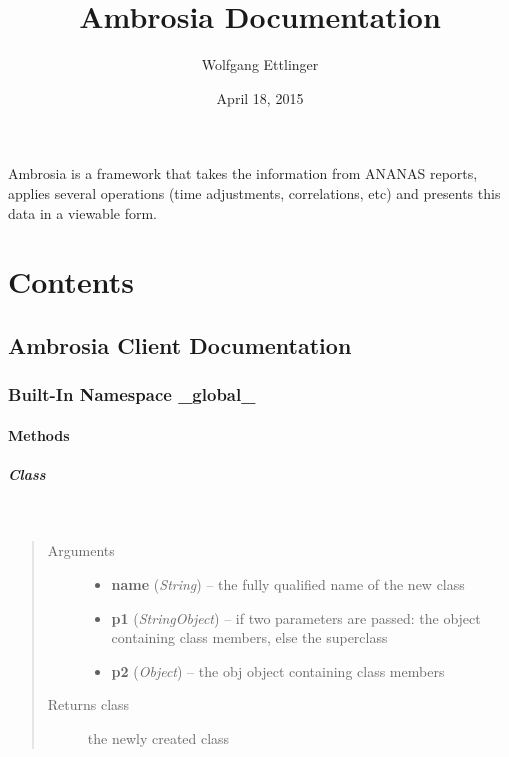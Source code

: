 \documentclass[letterpaper,10pt,english]{sphinxmanual}
\title{Ambrosia Documentation}
\date{April 18, 2015}
\author{Wolfgang Ettlinger}
\begin{document}
\maketitle
\tableofcontents
{}\label{index::doc}


Ambrosia is a framework that takes the information from ANANAS reports, applies several operations (time adjustments, correlations, etc) and presents this data in a viewable form.


\chapter{Contents}
\label{index:ambrosia-documentation}\label{index:contents}

\section{Ambrosia Client Documentation}
\label{client::doc}\label{client:ambrosia-client-documentation}

\subsection{Built-In Namespace \_global\_}
\label{_global_::doc}\label{_global_:built-in-namespace-global}

\subsubsection{Methods}
\label{_global_:methods}

\paragraph{Class}
\label{_global_:class}

\begin{fulllineitems}
\label{_global_:Class}~\begin{quote}\begin{description}
\item[{Arguments}] \leavevmode\begin{itemize}
\item {} 
\textbf{name} (\emph{String}) -- the fully qualified name of the new class

\item {} 
\textbf{p1} (\emph{String\textbar{}Object}) -- if two parameters are passed: the object containing class members, else the superclass

\item {} 
\textbf{p2} (\emph{Object}) -- the obj object containing class members

\end{itemize}

\item[{Returns class}] \leavevmode
the newly created class

\end{description}\end{quote}

\end{fulllineitems}
\end{document}
